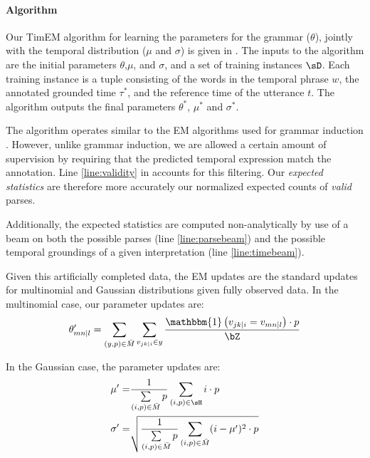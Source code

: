 \paragraph{Algorithm}
Our TimEM algorithm for learning the parameters for the grammar ($\theta$),
	jointly with the temporal distribution ($\mu$ and $\sigma$) is given 
	in .
The inputs to the algorithm are the initial parameters $\theta$,$\mu$, and
	$\sigma$, and a set of training instances $\sD$.
Each training instance is a tuple consisting of the words in the temporal
	phrase $w$, the annotated grounded time $\tau^*$, and the reference time
	of the utterance $t$.
The algorithm outputs the final parameters $\theta^*$, $\mu^*$ and $\sigma^*$.

The algorithm operates similar to the EM algorithms used for grammar induction
	\cite{key:2004klein-induction,key:1992carroll-induction}.
However, unlike grammar induction, we are allowed a certain amount of
	supervision by requiring that the predicted temporal expression
	match the annotation.
Line \ref{line:validity} in  accounts for this filtering.
Our \textit{expected statistics} are therefore more accurately our normalized
	expected counts of \textit{valid} parses.

Additionally, the expected statistics are computed non-analytically by use of
	a beam on both the possible parses (line \ref{line:parsebeam}) and the
	possible temporal groundings of a given interpretation (line
	\ref{line:timebeam}).

Given this artificially completed data, the EM updates are the standard
	updates for multinomial and Gaussian distributions given fully observed data.
In the multinomial case, our parameter updates are:
\begin{equation}
	\theta_{mn \mid l}' =
		\sum\limits_{(y,p) \in \bar M} \sum\limits_{v_{jk \mid i} \in y}
		\frac{
			\mathbbm{1}\left(v_{jk \mid i} = v_{mn \mid l}\right) \cdot p
		}{
			\bZ
		}
\label{eqn:multinomialEM}
\end{equation}

In the Gaussian case, the parameter updates are:
\begin{align}
	\mu' =&
		\frac{ 1 } { \sum\limits_{(i,p) \in \bar M}  p }
		\sum\limits_{(i,p) \in \sH} i \cdot p \\
	\sigma' =& \sqrt{
		\frac{ 1 } { \sum\limits_{(i,p) \in \bar M}  p }
		\sum\limits_{(i,p) \in \bar M} (i-\mu')^2 \cdot p
	}
\label{eqn:gaussianEM}
\end{align}

